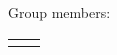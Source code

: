 
Group members:

\begin{center}
\begin{tabular}{ | m{9cm} | m{9cm}| }
\hline
\rule{0pt}{13cm}    &   \\
\hline
\rule{0pt}{13cm}    &   \\
\hline
\end{tabular}
\end{center}


